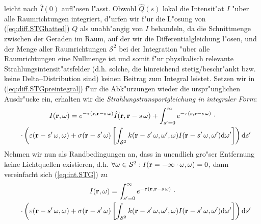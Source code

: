 	leicht nach ${\hat I}(0)$ aufl"osen l"asst. Obwohl ${\hat Q}(s)$ lokal die Intensit"at $I$ "uber alle Raumrichtungen integriert, d"urfen wir f"ur die L"osung von (\ref{eq:diff.STGhatted}) $Q$ als unabh"angig von $I$ behandeln, da die Schnittmenge zwischen der Geraden im Raum, auf der wir die Differentialgleichung l"osen, und der Menge aller Raumrichtungen $\mathcal{S}^2$ bei der Integration "uber alle Raumrichtungen eine Nullmenge ist und somit f"ur physikalisch relevante Strahlungsintensit"atsfelder (d.h. solche, die hinreichend stetig/beschr"ankt bzw. keine Delta--Distribution sind) keinen Beitrag zum Integral leistet.
	Setzen wir in (\ref{eq:diff.STGpreintegral}) f"ur die Abk"urzungen wieder die urspr"unglichen Ausdr"ucke ein, erhalten wir die {\em Strahlungstransportgleichung in integraler Form}:
	\begin{multline}
		I(\mathbf{r},\omega) = e^{-\tau(\mathbf{r},\mathbf{r}-s\,\omega)} {\hat I}(\mathbf{r},\mathbf{r}-s\,\omega) + \int_{s'=0}^\infty e^{-\tau(\mathbf{r},\mathbf{r}-s\,\omega)} \;\cdot \\
		\quad\cdot\left( \varepsilon(\mathbf{r}-s'\,\omega,\omega) + \sigma(\mathbf{r}-s'\,\omega)
		\left[ \int_{\mathcal{S}^2} k(\mathbf{r}-s'\,\omega,\omega',\omega)I(\mathbf{r}-s'\,\omega,\omega') \text{d}\omega'\right] \right) \text{d}s'
		\label{eq:int.STG}
	\end{multline}
	Nehmen wir nun als Randbedingungen an, dass in unendlich gro"ser Entfernung keine Lichtquellen existieren, d.h. $\forall \omega \in \mathcal{S}^2 : I(\mathbf{r}=-\infty\cdot\omega,\omega)=0$, dann vereinfacht sich (\ref{eq:int.STG}) zu
	\begin{multline}
		I(\mathbf{r},\omega) = \int_{s'=0}^\infty e^{-\tau(\mathbf{r},\mathbf{r}-s\,\omega)} \;\cdot \\
		\quad\cdot\left( \varepsilon(\mathbf{r}-s'\,\omega,\omega) + \sigma(\mathbf{r}-s'\,\omega)
		\left[ \int_{\mathcal{S}^2} k(\mathbf{r}-s'\,\omega,\omega',\omega)I(\mathbf{r}-s'\,\omega,\omega') \text{d}\omega'\right] \right) \text{d}s'
		\label{eq:int.STGdarkbg}
	\end{multline}


